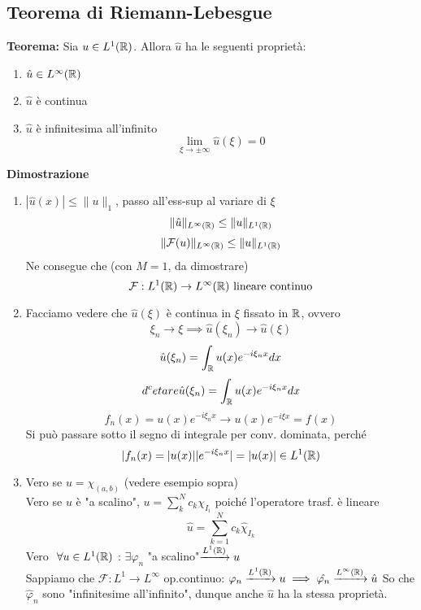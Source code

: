 \subsection{Teorema di Riemann-Lebesgue}
\begin{tcolorbox}
\textbf{Teorema: }Sia $u\in L^{1}(\mathbb{R})$. Allora $\hat{u}$ ha le seguenti proprietà:
\begin{enumerate}
	\item $\hat{u}\in L^{\infty}(\mathbb{R})$
	\item $\hat{u}$ è continua
	\item $\hat{ u}$ è infinitesima all'infinito
		\[\lim_{\xi \to \pm \infty} \hat{u}(\xi)=0\]
\end{enumerate}

\end{tcolorbox}
\textbf{Dimostrazione} 
\begin{enumerate}
	\item $|\hat{u}(x)|\le \|u\|_1$, passo all'ess-sup al variare di $\xi$ 
		\[\|\hat{u}\|_{L^{\infty}(\mathbb{R})}\le \|u\|_{L^{1}(\mathbb{R})}\]
		\[\|\mathcal F(u)\|_{L^{\infty}(\mathbb{R})}\le \|u\|_{L^{1}(\mathbb{R})}\]
		Ne consegue che (con $M=1$, da dimostrare)
		\[\mathcal F:L^{1}(\mathbb{R})\to L^{\infty}(\mathbb{R})\text{ lineare continuo}\]
	\item Facciamo vedere che $\hat{ u}(\xi)$ è continua in $\xi$ fissato in $\mathbb{R}$, ovvero
		\[\xi_n\to \xi\implies \hat{u}(\xi_n)\to \hat{ u}(\xi)\]
		\[\hat{u}(\xi_n)= \int_{\mathbb{R}}^{} u(x) e^{-i\xi_n x}dx\] 
		\[d^{c}etare \hat{u}(\xi_n)= \int_{\mathbb{R}}^{} u(x) e^{-i\xi_n x}dx\] 
		\[f_n(x)=u(x)e^{-i\xi_n x}\to u(x)e ^{-i\xi x}=f(x)\]
		Si può passare sotto il segno di integrale per conv. dominata, perché
		\[|f_n(x)=|u(x)| |e^{-i\xi_n x}|=|u(x)|\in L^{1}(\mathbb{R})\]
	\item Vero se $u=\chi_{(a,b)}$ (vedere esempio sopra)
		\\Vero se $u$ è "a scalino", $u=\sum_{k}^{N} c_k\chi_{I_i}$ poiché l'operatore trasf. è lineare
		\[\hat{ u}=\sum_{k=1}^{N} c_k \hat{\chi}_{I_k}\]
		Vero $\ \forall u\in L^{1}(\mathbb{R})$ : $\exists \varphi_n$ "a scalino"$\xrightarrow{L^{1}(\mathbb{R})} u$
		\\Sappiamo che $\mathcal F:L^1\to L^\infty$ op.continuo: $\varphi_n\xrightarrow{L^{1}(\mathbb{R})}u\implies \hat{\varphi_n}\xrightarrow{L^{\infty}(\mathbb{R})}\hat{u}$
So che $\hat{\varphi}_n$ sono "infinitesime all'infinito", dunque anche $\hat{u}$ ha la stessa proprietà.

\end{enumerate}
